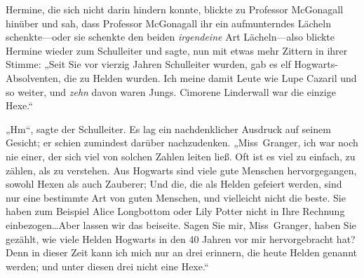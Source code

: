 Hermine, die sich nicht darin hindern konnte, blickte zu Professor McGonagall hinüber und sah, dass Professor McGonagall ihr ein aufmunterndes Lächeln schenkte—oder sie schenkte den beiden \emph{irgendeine} Art Lächeln—also blickte Hermine wieder zum Schulleiter und sagte, nun mit etwas mehr Zittern in ihrer Stimme: „Seit Sie vor vierzig Jahren Schulleiter wurden, gab es elf Hogwarts-Absolventen, die zu Helden wurden. Ich meine damit Leute wie Lupe Cazaril und so weiter, und \emph{zehn} davon waren Jungs. Cimorene Linderwall war die einzige Hexe.“

„Hm“, sagte der Schulleiter. Es lag ein nachdenklicher Ausdruck auf seinem Gesicht; er schien zumindest darüber nachzudenken. „Miss~Granger, ich war noch nie einer, der sich viel von solchen Zahlen leiten ließ. Oft ist es viel zu einfach, zu zählen, als zu verstehen. Aus Hogwarts sind viele gute Menschen hervorgegangen, sowohl Hexen als auch Zauberer; Und die, die als Helden gefeiert werden, sind nur eine bestimmte Art von guten Menschen, und vielleicht nicht die beste. Sie haben zum Beispiel Alice Longbottom oder Lily Potter nicht in Ihre Rechnung einbezogen…Aber lassen wir das beiseite. Sagen Sie mir, Miss~Granger, haben Sie gezählt, wie viele Helden Hogwarts in den 40 Jahren vor mir hervorgebracht hat? Denn in dieser Zeit kann ich mich nur an drei erinnern, die heute Helden genannt werden; und unter diesen drei nicht eine Hexe.“

